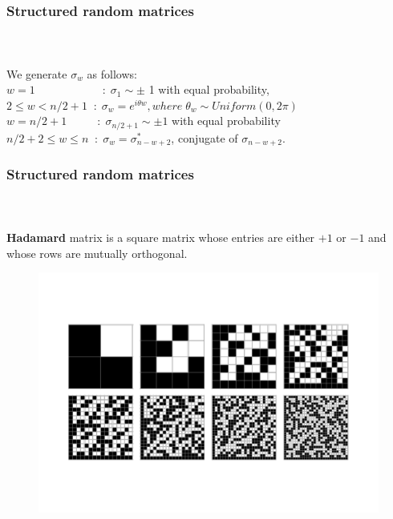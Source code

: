 \begin{frame}[t]
	\frametitle{Structured random matrices}
	\framesubtitle{~~}  %
	We generate $\sigma_{w}$ as follows:
    \\[1em]
    
    $w=1\qquad \qquad \qquad : \; \sigma_{1} \sim \pm$ 1 with equal probability,
    \\[1em]
    $2 \le w < n/2+1 \; \; : \; \sigma_{w}=e^{i\theta w}, where \; {\theta}_{w} \sim Uniform(0,2\pi) $
    \\[1em]
    $w=n/2+1 \qquad \; \; \, : \; \sigma_{n/2+1} \sim \pm 1 $ with equal probability 
    \\[1em]
    
    $n/2+2 \le w \le n \; \; : \; \sigma_{w}=\sigma^{*}_{n-w+2}$, conjugate of  $\sigma_{n-w+2}$.
    

\end{frame}
\begin{frame}[t]
	\frametitle{Structured random matrices}
	\framesubtitle{~~}  %
	 \textbf{Hadamard} matrix is a square matrix whose entries are either $+1$ or $−1$ and whose rows are mutually orthogonal.
\begin{figure}[h]
\centering
\includegraphics[width=0.7\linewidth]{HadamardMatrices_800}
\caption{}
\label{fig:HadamardMatrices_800}
\end{figure}

\end{frame}
